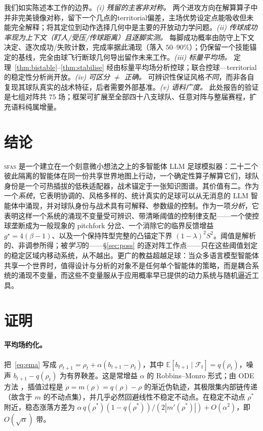 \documentclass[11pt,UTF8,fontset=fandol]{ctexart}
\newcommand{\E}{\mathbb{E}}
\newcommand{\F}{\mathcal{F}}
\newcommand{\sfas}{\textsc{sfas}}
\theoremstyle{plain}
\theoremstyle{definition}
\theoremstyle{remark}
\begin{document}
我们如实陈述本工作的边界。\emph{(i) 残留的主客非对称。} 两个进攻方向在解算算子中并非完美镜像对称，留下一个几点的territorial偏差，主场优势设定点能吸收但未能完全解释；将其定位到动作选择几何中是主要的开放动力学问题。\emph{(ii) 传球成功率现为上下文（盯人/受压/传球距离）且逐脚实测。} 每脚成功概率由防守上下文决定、逐次成功/失败计数，完成率据此涌现（落入 $50$--$90\%$）；仍保留一个技能锚定的基线，完全由球飞行断球几何导出留作未来工作。\emph{(iii) 标量平均场。} 定理~\ref{thm:bistable}--\ref{thm:stabilise} 经由标量平均场分析控球；联合控球—territorial的稳定性分析尚开放。\emph{(iv) 可区分 $\neq$ 正确。} 可辨识性保证风格\emph{不同}，而非各自复现其球队真实的战术特征，后者需要外部基准。\emph{(v) 语料广度。} 此处报告的验证是七组对阵共 $75$ 场；框架可扩展至全部四十八支球队、任意对阵与整届赛程，扩充语料纯属增量。

\section{结论}\label{sec:concl}

\sfas{} 是一个建立在一个刻意微小想法之上的多智能体 LLM 足球模拟器：二十二个彼此隔离的智能体在同一份共享世界地图上行动，一个确定性算子解算它们，球队身份是一个可热插拔的低秩适配器，战术锚定于一张知识图谱。其价值有二。作为一个\emph{系统}，它表明协调的、风格多样的、统计真实的足球可以从无消息的 LLM 智能体中涌现，并对球队身份与战术具有可解释、参数级的控制。作为一项\emph{分析}，它表明这样一个系统的涌现不变量受可辨识、带清晰阈值的控制律支配——一个使控球垄断成为一般现象的 pitchfork 分岔、一个消除它的临界反馈增益 $g^\star=4(\beta-1)$、以及一个保持阵型完整的凸锚定下界 $(1-\lambda)^2S^2$。阈值是解析的、非调参所得；被\emph{学习}的——\S\ref{sec:poss} 的逐对阵工作点——只在这些阈值划定的稳定区域内移动系统，从不越出。更广的教益超越足球：当众多语言模型智能体共享一个世界时，值得设计与分析的对象不是任何单个智能体的策略，而是耦合系统的涌现不变量，而这些不变量服从于应用概率早已提供的动力系统与随机逼近工具。

\appendix
\section{证明}\label{app:proofs}

\paragraph{平均场约化。} 把~\eqref{eq:ema} 写成 $\rho_{t+1}=\rho_t+\alpha(b_{t+1}-\rho_t)$，其中 $\E[b_{t+1}\mid\F_t]=q(\rho_t)$，噪声 $b_{t+1}-q(\rho_t)$ 为有界鞅差。这是常增益 $\alpha$ 的 Robbins--Monro 形式；由 ODE 方法 \citep{benaim1999,kushner2003}，插值过程是 $\dot\rho=m(\rho)=q(\rho)-\rho$ 的渐近伪轨迹，其极限集内部链传递（故含于 $m$ 的不动点集），并几乎必然回避线性不稳定不动点。在稳定不动点 $\rho^\ast$ 附近，稳态涨落方差为 $\alpha\,q(\rho^\ast)(1-q(\rho^\ast))/(2|m'(\rho^\ast)|)+O(\alpha^2)$，即 $O(\sqrt\alpha)$ 带。
\end{document}
